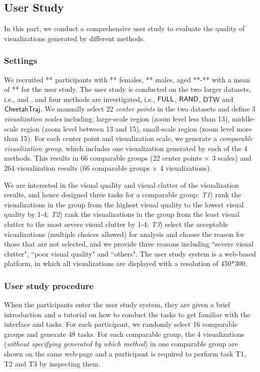\subsection{User Study}\label{sec:user}

In this part, we conduct a comprehensive user study to evaluate the quality of visualizations generated by different methods.

\subsubsection{Settings}
We recruited ** participants with ** females, ** males, aged **-** with a mean of ** for the user study. The user study is conducted on the two larger datasets, i.e., \pt{} and \sz{}, and four methods are investigated, i.e., $\mathsf{FULL}$, $\mathsf{RAND}$, $\mathsf{DTW}$ and $\mathsf{CheetahTraj}$. We manually select 22 \textit{center points} in the two datasets and define 3 \textit{visualization scales} including:
large-scale region (zoom level less than 13), middle-scale region (zoom level between 13 and 15), small-scale region (zoom level more than 15). For each center point and visualization scale, we generate a \textit{comparable visualization group}, which includes one visualization generated by each of the 4 methods. This results in 66 comparable groups (22 center points $\times$ 3 scales) and 264 visualization results (66 comparable groups $\times$ 4 visualizations).

We are interested in the visual quality and visual clutter of the visualization results, and hence designed three tasks for a comparable group: \textit{T1}) rank the visualizations in the group from the highest visual quality to the lowest visual quality by 1-4;
\textit{T2}) rank the visualizations in the group from the least visual clutter to the most severe visual clutter by 1-4;
\textit{T3}) select the acceptable visualizations (multiple choices allowed) for analysis and choose the reason for those that are not selected, and we provide three reasons including ``severe visual clutter", ``poor visual quality" and ``others".  The user study system is a web-based platform, in which all visualizations are displayed with a resolution of 450*300.

\subsubsection{User study procedure}

When the participants enter the user study system, they are given a brief introduction and a tutorial on how to conduct the tasks to get familiar with the interface and tasks.
For each participant, we randomly select 16 comparable groups and generate 48 tasks.
For each comparable group, the 4 visualizations (\textit{without specifying generated by which method}) in one comparable group are shown on the same web-page and a participant is required to perform task T1, T2 and T3 by inspecting them.

